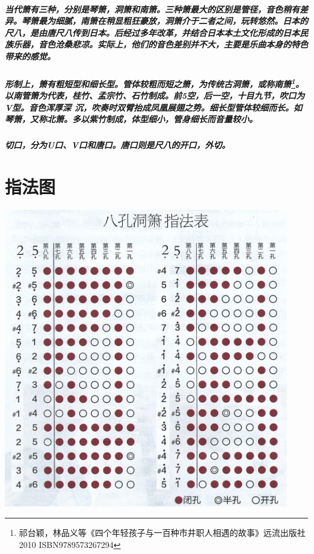 \documentclass[cn,pad,twocol]{elegantbook}
\begin{document}
\paragraph*{当代箫有三种，分别是琴箫，洞箫和南箫。三种箫最大的区别是管径，音色稍有差异。琴箫最为细腻，南箫在稍显粗狂豪放，洞箫介于二者之间，玩转悠然。日本的尺八，是由唐尺八传到日本。后经过多年改革，并结合日本本土文化形成的日本民族乐器，音色沧桑悲凉。实际上，他们的音色差别并不大，主要是乐曲本身的特色带来的感觉。}
\paragraph*{形制上，箫有粗短型和细长型。管体较粗而短之箫，为传统古洞箫，或称南箫\footnote{祁台颖，林品义等《四个年轻孩子与一百种市井职人相遇的故事》远流出版社 2010 ISBN9789573267294}。以南管箫为代表，桂竹、孟宗竹、石竹制成。前5空，后一空，十目九节，吹口为V型。音色浑厚深 沉，吹奏时双臂抬成凤凰展翅之势。细长型管体较细而长。如琴箫，又称北箫。多以紫竹制成，体型细小，管身细长而音量较小。}
\paragraph*{切口，分为U口、V口和唐口。唐口则是尺八的开口，外切。}
\chapter{指法图}
\includegraphics[width=0.93\textwidth]{dongxiao/Scan.jpeg}
\end{document}
